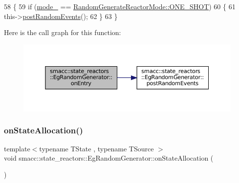 \begin{DoxyCode}
58         \{
59             \textcolor{keywordflow}{if} (\hyperlink{classsmacc_1_1state__reactors_1_1EgRandomGenerator_a73448940ff292ccc365a68bb39eecdf7}{mode\_} == \hyperlink{namespacesmacc_1_1state__reactors_a038f8e362ad6d35494c940ee4c97a52ea5bc2964599423c796ecf0aaecdc5be9d}{RandomGenerateReactorMode::ONE\_SHOT})
60             \{
61                 this->\hyperlink{classsmacc_1_1state__reactors_1_1EgRandomGenerator_ab570c2d1a3e70adb8cfacfcd9000715e}{postRandomEvents}();
62             \}
63         \}
\end{DoxyCode}
Here is the call graph for this function\+:
\nopagebreak
\begin{figure}[H]
\begin{center}
\leavevmode
\includegraphics[width=350pt]{classsmacc_1_1state__reactors_1_1EgRandomGenerator_aec89532c1b53e42e5d9006eddfea10e6_cgraph}
\end{center}
\end{figure}
\mbox{\label{classsmacc_1_1state__reactors_1_1EgRandomGenerator_ad2e828248d15912cfe27953c8a0ddd51}} 
\subsubsection{\texorpdfstring{on\+State\+Allocation()}{onStateAllocation()}}
{\footnotesize\ttfamily template$<$typename T\+State , typename T\+Source $>$ \\
void smacc\+::state\+\_\+reactors\+::\+Eg\+Random\+Generator\+::on\+State\+Allocation (\begin{DoxyParamCaption}{ }\end{DoxyParamCaption})\hspace{0.3cm}{\ttfamily [inline]}}



